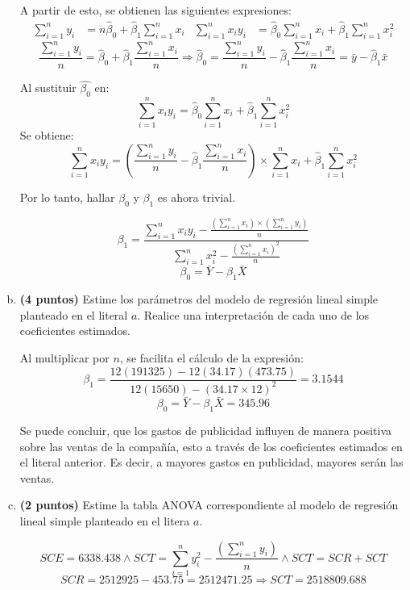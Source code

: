 \documentclass[../main.tex]{subfiles}
\begin{document}
\begin{enumerate}[(a)]
A partir de esto, se obtienen las siguientes expresiones:
\begin{align*}
	\sum_{i = 1}^{n} y_i &= n\hat{\beta}_0 + \hat{\beta}_1 \sum_{i = 1}^{n} x_i &   	\sum_{i = 1}^{n} x_iy_i &= \hat{\beta}_0 \sum_{i = 1}^{n} x_i + \hat{\beta}_1 \sum_{i = 1}^{n} x_i^2
\end{align*}
$$\frac{\sum_{i = 1}^{n} y_i}{n} = \hat{\beta}_0 + \hat{\beta}_1 \frac{\sum_{i = 1}^{n} x_i}{n} \Rightarrow \hat{\beta}_0 = \frac{\sum_{i = 1}^{n} y_i}{n} - \hat{\beta}_1 \frac{\sum_{i = 1}^{n} x_i}{n} = \bar{y} - \hat{\beta}_1 \bar{x}$$

Al sustituir $\hat{\beta_0}$ en:
$$\sum_{i = 1}^{n} x_iy_i = \hat{\beta}_0 \sum_{i = 1}^{n} x_i + \hat{\beta}_1 \sum_{i = 1}^{n} x_i^2$$
Se obtiene:
$$\sum_{i = 1}^{n} x_iy_i = \left( \frac{\sum_{i = 1}^{n} y_i}{n} - \hat{\beta}_1 \frac{\sum_{i = 1}^{n} x_i}{n}\right) \times \sum_{i = 1}^{n} x_i + \hat{\beta}_1 \sum_{i = 1}^{n} x_i^2$$

Por lo tanto, hallar $\beta_0$ y $\beta_1$  es ahora trivial.

$$\beta_1 = \frac{\sum_{i = 1}^{n} x_iy_i - \frac{\left( \sum_{i=1}^{n} x_i\right) \times \left(\sum_{i=1}^{n} y_i \right)}{n}}{\sum_{i=1}^{n} x_i^2 - \frac{\left( \sum_{i=1}^{n} x_i\right)^2}{n}}$$
$$\beta_0 = \bar{Y} - \beta_1 \bar{X}$$

\item \textbf{(4 puntos)} Estime los parámetros del modelo de regresión lineal simple planteado en el literal $a$. Realice una interpretación de cada uno de los coeficientes estimados.

Al multiplicar por $n$, se facilita el cálculo de la expresión:
$$\beta_1 = \frac{12(191325) - 12(34.17)(473.75)}{12(15650) - (34.17  \times 12)^2} = 3.1544$$
$$\beta_0 = \bar{Y} - \beta_1 \bar{X} = 345.96$$

Se puede concluir, que los gastos de publicidad influyen de manera positiva sobre las ventas de la compañía, esto a través de los coeficientes estimados en el literal anterior. Es decir, a mayores gastos en publicidad, mayores serán las ventas.

\item \textbf{(2 puntos)} Estime la tabla ANOVA correspondiente al modelo de regresión lineal simple planteado en el litera $a$.

$$SCE = 6338.438 \wedge SCT = \sum_{i = 1}^{n} y_i ^2 - \frac{\left(\sum_{i = 1}^{n} y_i\right)}{n} \wedge SCT = SCR + SCT$$
$$SCR = 2512925 - 453.75 = 2512471.25 \Rightarrow SCT  = 2518809.688$$


\end{enumerate}
\end{document}
